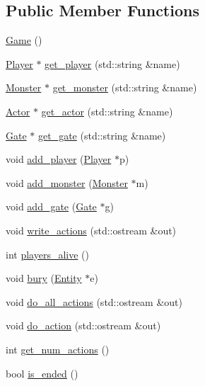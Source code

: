 \subsection*{Public Member Functions}
\begin{DoxyCompactItemize}
\item 
\hyperlink{class_game_ad59df6562a58a614fda24622d3715b65}{Game} ()
\item 
\hyperlink{class_player}{Player} $\ast$ \hyperlink{class_game_aeccd4cec699287294ff72399eea97bf8}{get\-\_\-player} (std\-::string \&name)
\item 
\hyperlink{class_monster}{Monster} $\ast$ \hyperlink{class_game_a84d0739f97b1d522c1c5739f1cef3e75}{get\-\_\-monster} (std\-::string \&name)
\item 
\hyperlink{class_actor}{Actor} $\ast$ \hyperlink{class_game_aa0e2afd92f042ebbc3635c05d8c2a412}{get\-\_\-actor} (std\-::string \&name)
\item 
\hyperlink{class_gate}{Gate} $\ast$ \hyperlink{class_game_af381f79ab245cb6075797323ccf730c1}{get\-\_\-gate} (std\-::string \&name)
\item 
void \hyperlink{class_game_a532e7897423e470019ada16917b457c2}{add\-\_\-player} (\hyperlink{class_player}{Player} $\ast$p)
\item 
void \hyperlink{class_game_a5b3ceb773fe5f462bb23679ed0482db1}{add\-\_\-monster} (\hyperlink{class_monster}{Monster} $\ast$m)
\item 
void \hyperlink{class_game_a2b5f926b163ba9ff405f45c5f3e7d734}{add\-\_\-gate} (\hyperlink{class_gate}{Gate} $\ast$g)
\item 
void \hyperlink{class_game_a73b72d3098c7c9a8d232b5fd4b1139ad}{write\-\_\-actions} (std\-::ostream \&out)
\item 
int \hyperlink{class_game_ad6165e671cd454ac4c2296f306d293eb}{players\-\_\-alive} ()
\item 
void \hyperlink{class_game_a1845d7f4c11f16a76e79f119f4077f17}{bury} (\hyperlink{class_entity}{Entity} $\ast$e)
\item 
void \hyperlink{class_game_a8f72aa6ced41ae11bdaa48ef73d11d39}{do\-\_\-all\-\_\-actions} (std\-::ostream \&out)
\item 
void \hyperlink{class_game_aba0acb0d0ec55e050440e9f398de773c}{do\-\_\-action} (std\-::ostream \&out)
\item 
int \hyperlink{class_game_aeb84d2cc01cb7e69e82a92bb41221d3e}{get\-\_\-num\-\_\-actions} ()
\item 
bool \hyperlink{class_game_a47be91dcc180c606507cc06d06d351b2}{is\-\_\-ended} ()

\end{DoxyCompactItemize}
